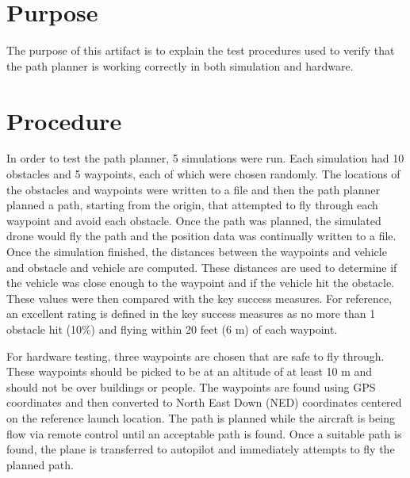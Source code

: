 \documentclass[]{auvsi_doc}
\begin{document}
\begin{AUVSITitlePage}
\begin{artifacttable}
\end{artifacttable}
\end{AUVSITitlePage}

\section*{Purpose}

The purpose of this artifact is to explain the test procedures used to verify that the path planner is working correctly in both simulation and hardware.

\section*{Procedure}

In order to test the path planner, 5 simulations were run. Each simulation had 10 obstacles and 5 waypoints, each of which were chosen randomly.
The locations of the obstacles and waypoints were written to a file and then the path planner planned a path, starting from the origin, that attempted to fly through each waypoint and avoid each obstacle.
Once the path was planned, the simulated drone would fly the path and the position data was continually written to a file. Once the simulation finished, the distances between the waypoints and vehicle and obstacle and vehicle are computed.
These distances are used to determine if the vehicle was close enough to the waypoint and if the vehicle hit the obstacle.
These values were then compared with the key success measures. For reference, an excellent rating is defined in the key success measures as no more than 1 obstacle hit (10\%) and flying within 20 feet (6 m) of each waypoint.

For hardware testing, three waypoints are chosen that are safe to fly through. These waypoints should be picked to be at an altitude of at least 10 m and should not be over buildings or people. The waypoints are found using GPS coordinates and then converted to North East Down (NED) coordinates centered on the reference launch location. The path is planned while the aircraft is being flow via remote control until an acceptable path is found. Once a suitable path is found, the plane is transferred to autopilot and immediately attempts to fly the planned path.
\end{document}
